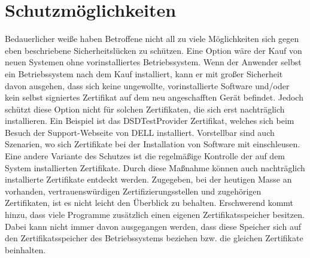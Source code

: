 \section{Schutzmöglichkeiten}
Bedauerlicher weiße haben Betroffene nicht all zu viele Möglichkeiten sich gegen eben beschriebene Sicherheitslücken zu schützen. 
Eine Option wäre der Kauf von neuen Systemen ohne vorinstalliertes Betriebssystem. Wenn der Anwender selbst ein Betriebssystem nach dem Kauf installiert, kann er mit großer Sicherheit davon ausgehen, dass sich keine ungewollte, vorinstallierte Software und/oder kein selbst signiertes Zertifikat auf dem neu angeschafften Gerät befindet. Jedoch schützt diese Option nicht für solchen Zertifikaten, die sich erst nachträglich installieren. Ein Beispiel ist das DSDTestProvider Zertifikat, welches sich beim Besuch der Support-Webseite von DELL installiert. Vorstellbar sind auch Szenarien, wo sich Zertifikate bei der Installation von Software mit einschleusen.
Eine andere Variante des Schutzes ist die regelmäßige Kontrolle der auf dem System installierten Zertifikate. Durch diese Maßnahme können auch nachträglich installierte Zertifikate entdeckt werden. Zugegeben, bei der heutigen Masse an vorhanden, vertrauenswürdigen Zertifizierungsstellen und zugehörigen Zertifikaten, ist es nicht leicht den Überblick zu behalten. Erschwerend kommt hinzu, dass viele Programme zusätzlich einen eigenen Zertifikatsspeicher besitzen. Dabei kann nicht immer davon ausgegangen werden, dass diese Speicher sich auf den Zertifikatsspeicher des Betriebssystems beziehen bzw. die gleichen Zertifikate beinhalten.
